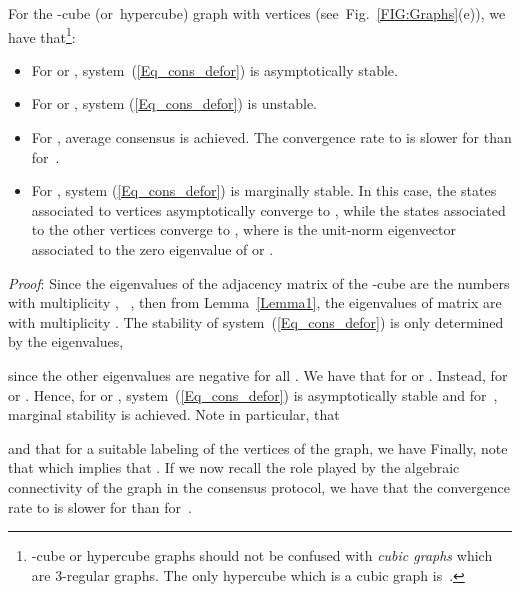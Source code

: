 \documentclass[letterpaper,9pt,twocolumn]{autart}
\begin{document}
\begin{proposition}[-cube ]
For the -cube (or~hypercube) graph  with  
vertices (see~Fig.~\ref{FIG:Graphs}(e)), we have that\footnote{-cube or hypercube graphs should not
be confused with \emph{cubic graphs} which are 3-regular graphs. The
only hypercube which is a cubic graph is~.}: \begin{itemize}
\item For  or , system~(\ref{Eq_cons_defor})
is asymptotically stable.
\item For  or ,
system (\ref{Eq_cons_defor}) is unstable.
\item For , average consensus is achieved. The convergence rate
to  is slower for  than for~.
\item For , system (\ref{Eq_cons_defor}) is marginally stable.
In this case, the states associated to  vertices asymptotically converge to
, while the states associated to the other
 vertices converge to , where  is the unit-norm eigenvector associated to the zero eigenvalue
of  or .
\end{itemize}\vspace{-0.2cm}
\emph{Proof}:
Since the eigenvalues of the adjacency matrix of the -cube are the
numbers  with multiplicity
, ~\cite[Sect.~1.4.6]{BrouwerHa_book12}, then from
Lemma~\ref{Lemma1}, the eigenvalues of matrix  
are  with multiplicity
. 
The stability of system~(\ref{Eq_cons_defor}) is only
determined by the eigenvalues, 

since the other  eigenvalues are negative for all .
We have that  for  or . Instead,
 for  or . Hence,  
for  or , system~(\ref{Eq_cons_defor})
is asymptotically stable and for~,
marginal stability is achieved. Note in particular, that 

and that for a suitable labeling of the vertices of the graph, we have 
Finally, note that  
which implies that .
If we now recall the role played by the algebraic connectivity of the graph in the
consensus protocol, we have that
the convergence rate to 
is slower for  than for~.~\hfill 
\end{proposition}
\vspace{-0.07cm}
\end{document}
